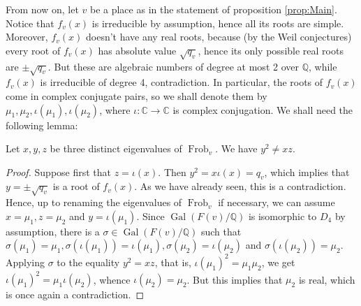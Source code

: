 From now on, let $v$ be a place as in the statement of proposition \ref{prop:Main}. 
Notice that $f_v(x)$ is irreducible by assumption, hence all its roots are simple. Moreover, $f_v(x)$ doesn't have any real roots, because (by the Weil conjectures) every root of $f_v(x)$ has absolute value $\sqrt{q_v}$, hence its only possible real roots are $\pm \sqrt{q_v}$. But these are algebraic numbers of degree at most 2 over $\mathbb{Q}$, while $f_v(x)$ is irreducible of degree 4, contradiction.
In particular, the roots of $f_v(x)$ come in complex conjugate pairs, so we shall denote them by $\mu_1, \mu_2, \iota(\mu_1), \iota(\mu_2)$, where $\iota : \mathbb{C} \to \mathbb{C}$ is complex conjugation.  We shall need the following lemma:

\begin{lemma}\label{lemma:Nonzero}
Let $x,y,z$ be three distinct eigenvalues of $\operatorname{Frob}_v$. We have $y^2 \neq xz$.
\end{lemma}
\begin{proof}
Suppose first that $z=\iota(x)$. Then $y^2=x\iota(x)=q_v$, which implies that $y=\pm \sqrt{q_v}$ is a root of $f_v(x)$. As we have already seen, this is a contradiction. Hence, up to renaming the eigenvalues of $\operatorname{Frob}_v$ if necessary, we can assume $x=\mu_1, z=\mu_2$ and $y=\iota(\mu_1)$. Since $\operatorname{Gal}(F(v)/\mathbb{Q})$ is isomorphic to $D_4$ by assumption, there is a $\sigma \in \operatorname{Gal}(F(v)/\mathbb{Q})$ such that $\sigma(\mu_1)=\mu_1, \sigma(\iota(\mu_1))=\iota(\mu_1), \sigma(\mu_2)=\iota(\mu_2)$ and $\sigma(\iota(\mu_2))=\mu_2$. Applying $\sigma$ to the equality $y^2=xz$, that is, $\iota(\mu_1)^2=\mu_1\mu_2$, we get $\iota(\mu_1)^2=\mu_1\iota(\mu_2)$, whence $\iota(\mu_2)=\mu_2$. 
But this implies that $\mu_2$ is real, which is once again a contradiction.
\end{proof}

